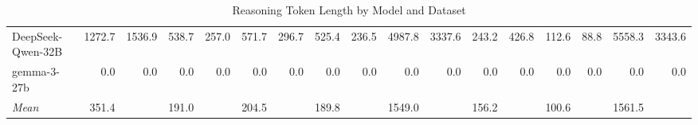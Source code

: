 \begin{table}[ht]
{\begin{tabular}{l r r r r r r r r r r r r r r r r}
      DeepSeek-Qwen-32B & 1272.7 & 1536.9 & 538.7 & 257.0 & 571.7 & 296.7 & 525.4 & 236.5 & 4987.8 & 3337.6 & 243.2 & 426.8 & 112.6 & 88.8 & 5558.3 & 3343.6 \\
      gemma-3-27b & 0.0 & 0.0 & 0.0 & 0.0 & 0.0 & 0.0 & 0.0 & 0.0 & 0.0 & 0.0 & 0.0 & 0.0 & 0.0 & 0.0 & 0.0 & 0.0 \\
      \midrule
      \textit{Mean} & 351.4 &  & 191.0 &  & 204.5 &  & 189.8 &  & 1549.0 &  & 156.2 &  & 100.6 &  & 1561.5 &  \\
      \bottomrule
    \end{tabular}%
  }
  \caption{Reasoning Token Length by Model and Dataset}
\end{table}
